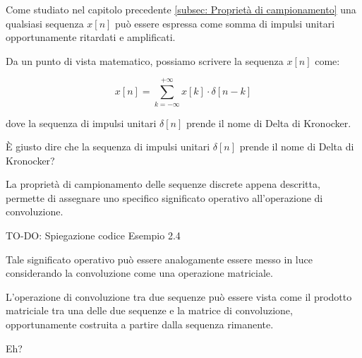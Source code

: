 Come studiato nel capitolo precedente \ref{subsec: Proprietà di campionamento}  
una qualsiasi sequenza $x \left[ n \right]$ può essere espressa come somma di impulsi unitari 
opportunamente ritardati e amplificati. \newline 

Da un punto di vista matematico, possiamo scrivere la sequenza $x \left[ n \right]$ come: 

{
    \Large 
    \begin{equation}
        x \left[ n \right] 
        = 
        \sum_{k = - \infty}^{+ \infty }
        x \left[ k \right] \cdot \delta \left[ n - k \right]
    \end{equation}
}

dove la sequenza di impulsi unitari $\delta \left[ n\right]$ prende il nome di Delta di Kronocker. \newline 


\begin{tcolorbox}[colback=red!5!white,colframe=red!75!black]
È giusto dire che la sequenza di impulsi unitari $\delta \left[ n\right]$ prende il nome di Delta di Kronocker? \newline 
\end{tcolorbox}

\label{Domanda 1}

La proprietà di campionamento delle sequenze discrete appena descritta, permette di assegnare uno specifico significato operativo all'operazione di convoluzione. \newline 

\begin{tcolorbox}[colback=green!5!white,colframe=green!75!black]
TO-DO: Spiegazione codice Esempio 2.4 
\end{tcolorbox}


Tale significato operativo può essere analogamente essere messo in luce considerando la convoluzione come una operazione matriciale. \newline 

L'operazione di convoluzione tra due sequenze può essere vista come il prodotto matriciale tra una delle due sequenze e la matrice di convoluzione, opportunamente costruita a partire dalla sequenza rimanente. \newline 

\begin{tcolorbox}[colback=red!5!white,colframe=red!75!black]
Eh?
\end{tcolorbox}

